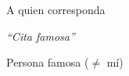 \cleardoublepage
\thispagestyle{empty}
\vspace*{0.4\textheight}
\hfill A quien corresponda \par 
\vspace*{0.03\textheight}
\hfill \emph{``Cita famosa''}\par
\hfill Persona famosa ($\neq$ mí)